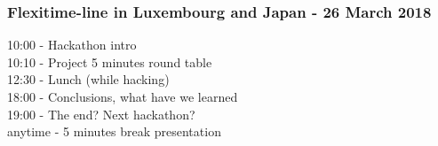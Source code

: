 \documentclass{beamer}
\begin{document}
  \begin{frame}
    \frametitle{Flexitime-line in Luxembourg and Japan - 26 March 2018}
    10:00 - Hackathon intro \\
    10:10 - Project 5 minutes round table\\
    12:30 - Lunch (while hacking)\\
    18:00 - Conclusions, what have we learned \\
    19:00 - The end? Next hackathon? \\
    anytime - 5 minutes break presentation
  \end{frame}
\end{document}
